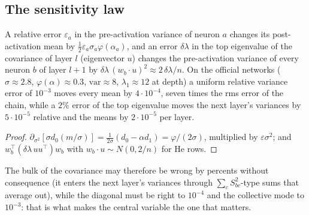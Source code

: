 \subsection{The sensitivity law}
\begin{proposition}[Sensitivity]\label{prop:sens}
A relative error $\varepsilon_a$ in the pre-activation variance of neuron $a$ changes its post-activation mean by
$\tfrac12\varepsilon_a\sigma_a\varphi(\alpha_a)$, and an error $\delta\lambda$ in the top eigenvalue of the
covariance of layer $l$ (eigenvector $u$) changes the pre-activation variance of every neuron $b$ of layer $l+1$
by $\delta\lambda\,(w_b\!\cdot\!u)^2\approx2\,\delta\lambda/n$. On the official networks ($\sigma\approx2.8$,
$\varphi(\alpha)\approx0.3$, $\mathrm{var}\approx8$, $\lambda_1\approx12$ at depth) a uniform relative variance
error of $10^{-3}$ moves every mean by $4\cdot10^{-4}$, seven times the rms error of the chain, while a $2\%$ error of
the top eigenvalue moves the next layer's variances by $5\cdot10^{-5}$ relative and the means by $2\cdot10^{-5}$ per
layer.
\end{proposition}
\begin{proof}
$\partial_{\sigma^2}[\sigma d_0(m/\sigma)]=\tfrac1{2\sigma}(d_0-\alpha d_1)=\varphi/(2\sigma)$, multiplied by
$\varepsilon\sigma^2$; and $w_b^\top(\delta\lambda\,uu^\top)w_b$ with $w_b\!\cdot\!u\sim N(0,2/n)$ for He rows.
\end{proof}
The bulk of the covariance may therefore be wrong by percents without consequence (it enters the next layer's
variances through $\sum_cS_{bc}^2$-type sums that average out), while the diagonal must be right to $10^{-4}$ and
the collective mode to $10^{-3}$: that is what makes the central variable the one that matters.

